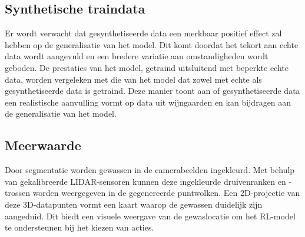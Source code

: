 \subsection{Synthetische traindata}
Er wordt verwacht dat gesynthetiseerde data een merkbaar positief effect zal hebben op de generalisatie van het model. Dit komt doordat het tekort aan echte data wordt aangevuld en een bredere variatie aan omstandigheden wordt geboden. De prestaties van het model, getraind uitsluitend met beperkte echte data, worden vergeleken met die van het model dat zowel met echte als gesynthetiseerde data is getraind. Deze manier toont aan of gesynthetiseerde data een realistische aanvulling vormt op data uit wijngaarden en kan bijdragen aan de generalisatie van het model.

\subsection{Meerwaarde}
Door segmentatie worden gewassen in de camerabeelden ingekleurd. Met behulp van gekalibreerde LIDAR-sensoren kunnen deze ingekleurde druivenranken en -trossen worden weergegeven in de gegenereerde puntwolken. Een 2D-projectie van deze 3D-datapunten vormt een kaart waarop de gewassen duidelijk zijn aangeduid. Dit biedt een visuele weergave van de gewaslocatie om het RL-model te ondersteunen bij het kiezen van acties.



